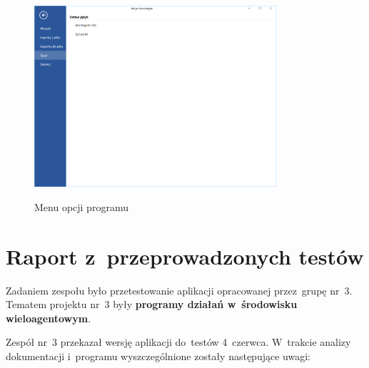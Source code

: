 \documentclass[11pt,a4paper]{article}
\begin{document}
\begin{figure}[H]
    \centering
    \includegraphics[width=0.8\textwidth]{res/img/options.png}
    \label{fig:options}
    \caption{Menu opcji programu}
\end{figure}

\section{Raport z~przeprowadzonych testów}
\label{sec:our-tests-report}

Zadaniem zespołu było przetestowanie aplikacji opracowanej przez~grupę nr~3.
Tematem projektu nr~3 były \textbf{programy działań w~środowisku wieloagentowym}.

Zespół nr~3 przekazał wersję aplikacji do~testów 4~czerwca.
W~trakcie analizy dokumentacji i~programu wyszczególnione zostały następujące uwagi:
\end{document}

